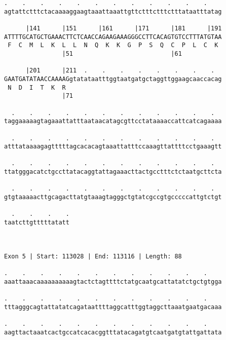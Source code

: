 \documentclass{article}
\begin{document}
\begin{Verbatim}
.    .    .    .    .    .    .    .    .    .    .    .    
agtattctttctacaaaaggaagtaaattaaattgttctttctttctttataatttatag
                                                            
      |141      |151      |161      |171      |181      |191
ATTTTGCATGCTGAAACTTCTCAACCAGAAGAAAGGGCCTTCACAGTGTCCTTTATGTAA
 F  C  M  L  K  L  L  N  Q  K  K  G  P  S  Q  C  P  L  C  K 
                |51                           |61           
  
      |201      |211  .    .    .    .    .    .    .    .  
GAATGATATAACCAAAAGgtatataatttggtaatgatgctaggttggaagcaaccacag
 N  D  I  T  K  R                                           
                |71                                         
  
  .    .    .    .    .    .    .    .    .    .    .    .  
taggaaaaagtagaaattatttaataacatagcgttcctataaaaccattcatcagaaaa
                                                            
  .    .    .    .    .    .    .    .    .    .    .    .  
atttataaaagagtttttagcacacagtaaattatttccaaagttattttcctgaaagtt
                                                            
  .    .    .    .    .    .    .    .    .    .    .    .  
ttatgggacatctgccttatacaggtattagaaacttactgcctttctctaatgcttcta
                                                            
  .    .    .    .    .    .    .    .    .    .    .    .  
gtgtaaaaacttgcagacttatgtaaagtagggctgtatcgccgtgcccccattgtctgt
                                                            
  .    .    .    .
taatcttgtttttatatt
                  
                  
 
Exon 5 | Start: 113028 | End: 113116 | Length: 88
 
.    .    .    .    .    .    .    .    .    .    .    .    
aaattaaacaaaaaaaaaagtactctagttttctatgcaatgcattatatctgctgtgga
                                                            
.    .    .    .    .    .    .    .    .    .    .    .    
tttagggcagtattatatcagataattttaggcatttggtaggcttaaatgaatgacaaa
                                                            
.    .    .    .    .    .    .    .    .    .    .    .    
aagttactaaatcactgccatcacacggtttatacagatgtcaatgatgtattgattata
                                                            

\end{Verbatim}
\end{document}
